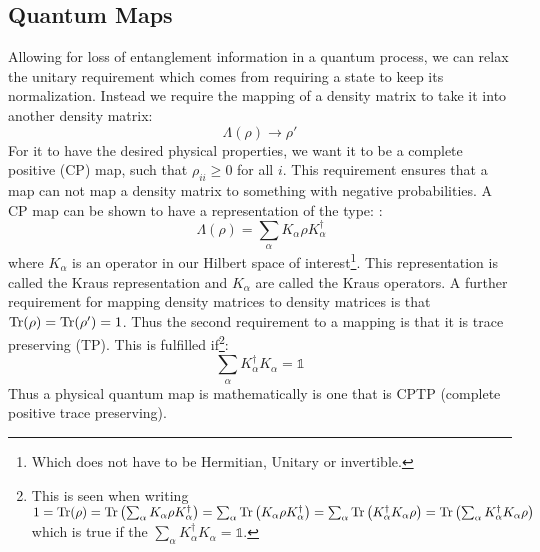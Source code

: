 \subsection{Quantum Maps}
Allowing for loss of entanglement information in a quantum process, we can relax the unitary requirement which comes from requiring a state to keep its normalization. Instead we require the mapping of a density matrix to take it into another density matrix:
\begin{equation}
    \Lambda(\rho) \to \rho'
\end{equation}
For it to have the desired physical properties, we want it to be a complete positive (CP) map, such that $\rho_{ii} \geq 0$ for all $i$. This requirement ensures that a map can not map a density matrix to something with negative probabilities. A CP map can be shown to have a representation of the type: \cite{greenbaum_introduction_2015}:
\begin{equation}\
    \Lambda(\rho) = \sum_\alpha K_\alpha\rho K_\alpha^\dagger
\end{equation}
where $K_\alpha$ is an operator in our Hilbert space of interest\footnote{Which does not have to be Hermitian, Unitary or invertible.}. This representation is called the Kraus representation and $K_\alpha$ are called the Kraus operators. A further requirement for mapping density matrices to density matrices is that $\Tr
(\rho) = \Tr(\rho') = 1$. Thus the second requirement to a mapping is that it is trace preserving (TP). This is fulfilled if\footnote{This is seen when writing $1 = \Tr(\rho) = \Tr\left(\sum_\alpha K_\alpha\rho K_\alpha^\dagger \right) = \sum_\alpha\Tr\left(K_\alpha\rho K_\alpha^\dagger \right)= \sum_\alpha\Tr\left(K_\alpha^\dagger K_\alpha\rho  \right) = \Tr\left(\sum_\alpha K_\alpha^\dagger K_\alpha\rho  \right)$ which is true if the $\sum_\alpha K_\alpha^\dagger K_\alpha = \mathbb{1}$.}:
\begin{equation}
    \sum_\alpha K_\alpha^\dagger K_\alpha = \mathbb{1}
\end{equation}
Thus a physical quantum map is mathematically is one that is CPTP (complete positive trace preserving). \cite{greenbaum_introduction_2015}

